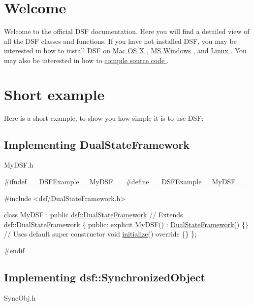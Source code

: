 \hypertarget{index_welcome}{}\section{Welcome}\label{index_welcome}
Welcome to the official D\+S\+F documentation. Here you will find a detailed view of all the D\+S\+F classes and functions. If you have not installed D\+S\+F, you may be interested in how to install D\+S\+F on \hyperlink{_mac}{Mac O\+S X }, \hyperlink{_win}{M\+S Windows }, and \hyperlink{_linux}{Linux }. You may also be interested in how to \hyperlink{source}{compile source code }.\hypertarget{index_example}{}\section{Short example}\label{index_example}
Here is a short example, to show you how simple it is to use D\+S\+F\+: \hypertarget{index_dsf}{}\subsection{Implementing Dual\+State\+Framework}\label{index_dsf}
My\+D\+S\+F.\+h 
\begin{DoxyCodeInclude}
\textcolor{preprocessor}{#ifndef \_\_DSFExample\_\_MyDSF\_\_}
\textcolor{preprocessor}{#define \_\_DSFExample\_\_MyDSF\_\_}

\textcolor{preprocessor}{#include <dsf/DualStateFramework.h>}

\textcolor{keyword}{class }MyDSF : \textcolor{keyword}{public} \hyperlink{classdsf_1_1_dual_state_framework}{dsf::DualStateFramework} \textcolor{comment}{// Extends dsf::DualStateFramework}
\{
\textcolor{keyword}{public}:
    \textcolor{keyword}{explicit} MyDSF() : \hyperlink{namespacedsf_a68ac3b6a0526bfa7f6a412918afb1841}{DualStateFramework}() \{\} \textcolor{comment}{// Uses default super constructor}
    \textcolor{keywordtype}{void} \hyperlink{classdsf_1_1_dual_state_framework_a809a7bba4148e17ea9a43a0a035383ba}{initialize}()\textcolor{keyword}{ override }\{\}
\};

\textcolor{preprocessor}{#endif}
\end{DoxyCodeInclude}
\hypertarget{index_syncObj}{}\subsection{Implementing dsf\+::\+Synchronized\+Object}\label{index_syncObj}
Sync\+Obj.\+h 
